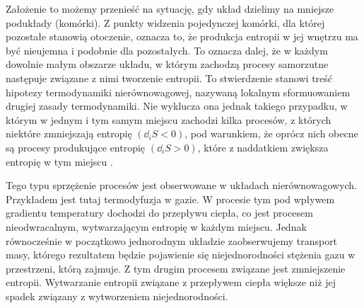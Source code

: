 \documentclass[10pt, a4paper, twoside, onecolumn]{article}
\numberwithin{equation}{section}
\newcommand{\dbar}{d\hspace*{-0.08em}\bar{}\hspace*{0.1em}}
\begin{document}
	Założenie to możemy przenieść na sytuację, gdy układ dzielimy na mniejsze podukłady (komórki). Z punkty widzenia pojedynczej komórki, dla której pozostałe stanowią otoczenie, oznacza to, że produkcja entropii w jej wnętrzu ma być nieujemna i podobnie dla pozostałych. To oznacza dalej, że w każdym dowolnie małym obszarze układu, w którym zachodzą procesy samorzutne następuje związane z nimi tworzenie entropii. To stwierdzenie stanowi treść hipotezy termodynamiki nierównowagowej, nazywaną lokalnym sformuowaniem drugiej zasady termodynamiki. %
	Nie wyklucza ona jednak takiego przypadku, w którym w jednym i tym samym miejscu zachodzi kilka procesów, z których niektóre zmniejszają entropię \((\dd_{i}S<0)\), pod warunkiem, że oprócz nich obecne są procesy produkujące entropię \((\dd_{i}S>0)\), które z naddatkiem zwiększa entropię w tym miejscu \cite{orlik, pigon1, guminski}. \par
	Tego typu sprzężenie procesów jest obserwowane w układach nierównowagowych. Przykładem jest tutaj termodyfuzja w gazie. W procesie tym pod wpływem gradientu temperatury dochodzi do przepływu ciepła, co jest procesem nieodwracalnym, wytwarzającym entropię w każdym miejscu. Jednak równocześnie w początkowo jednorodnym układzie zaobserwujemy transport masy, którego rezultatem będzie pojawienie się niejednorodności stężenia gazu w przestrzeni, którą zajmuje. Z tym drugim procesem związane jest zmniejszenie entropii. Wytwarzanie entropii związane z przepływem ciepła większe niż jej spadek związany z wytworzeniem niejednorodności. 
\end{document}
